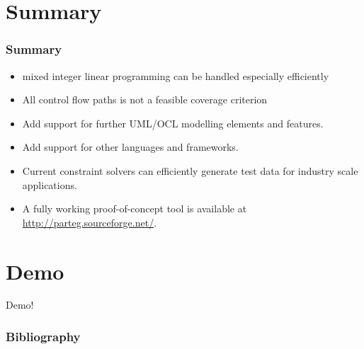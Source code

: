 \documentclass{beamer}
\begin{document}
\section{Summary}
\begin{frame}
\frametitle{Summary}
\begin{itemize}
  \item mixed integer linear programming can be handled especially efficiently
  \item All control flow paths is not a feasible coverage criterion
  \vspace{0.2cm}
  \item Add support for further UML/OCL modelling elements and features.
  \item Add support for other languages and frameworks.
  \vspace{0.2cm}
  \item Current constraint solvers can efficiently generate test data for industry scale applications.
  \item A fully working proof-of-concept tool is available at \href{http://parteg.sourceforge.net/}{http://parteg.sourceforge.net/}.
\end{itemize}
\end{frame}

\section{Demo}
\begin{frame}
\begin{block}{}
\begin{center}
\Huge{Demo!}
\end{center}
\end{block}
\end{frame}



\frametitle{Bibliography}

%

\end{document}
